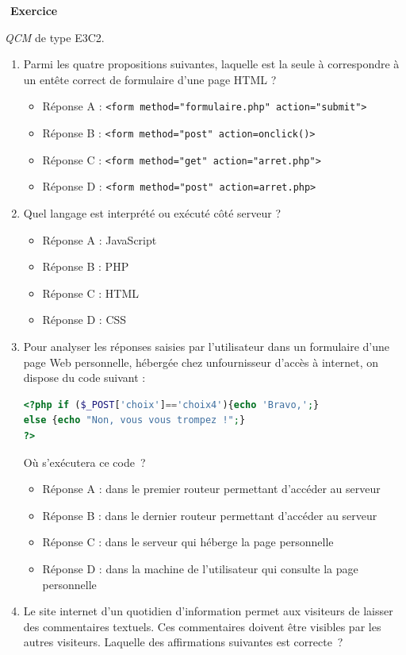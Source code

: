 \documentclass[
  11pt,
]{article}
\newcommand{\passthrough}[1]{#1}
\providecommand{\tightlist}{%
  \setlength{\itemsep}{0pt}\setlength{\parskip}{0pt}}
\newcounter{exo}
\newenvironment{exercice}[1]
{\par \medskip   \addtocounter{exo}{1} \noindent  
\begin{bclogo}[arrondi =0.1,   noborder = true, logo=\bccrayon, marge=4]{~\textbf{Exercice} \textbf{\theexo} {\itshape #1} }  \par}
{
\end{bclogo}
 \par \bigskip }
\newcounter{prop}
\newcounter{def}
\begin{document}
\begin{exercice}{}

\emph{QCM} de type E3C2.

\begin{enumerate}
\def\labelenumi{\arabic{enumi}.}
\item
  Parmi les quatre propositions suivantes, laquelle est la seule à
  correspondre à un entête correct de formulaire d'une page HTML ?

  \begin{itemize}
  \tightlist
  \item
    Réponse A :
    \passthrough{\lstinline!<form method="formulaire.php" action="submit">!}
  \item
    Réponse B :
    \passthrough{\lstinline!<form method="post" action=onclick()>!}
  \item
    Réponse C :
    \passthrough{\lstinline!<form method="get" action="arret.php">!}
  \item
    Réponse D :
    \passthrough{\lstinline!<form method="post" action=arret.php>!}
  \end{itemize}
\item
  Quel langage est interprété ou exécuté côté serveur ?

  \begin{itemize}
  \tightlist
  \item
    Réponse A : JavaScript
  \item
    Réponse B : PHP
  \item
    Réponse C : HTML
  \item
    Réponse D : CSS
  \end{itemize}
\item
  Pour analyser les réponses saisies par l'utilisateur dans un
  formulaire d'une page Web personnelle, hébergée chez unfournisseur
  d'accès à internet, on dispose du code suivant :

\begin{lstlisting}[language=PHP]
<?php if ($_POST['choix']=='choix4'){echo 'Bravo,';}
else {echo "Non, vous vous trompez !";}
?>
\end{lstlisting}

  Où s'exécutera ce code~?

  \begin{itemize}
  \tightlist
  \item
    Réponse A : dans le premier routeur permettant d'accéder au serveur
  \item
    Réponse B : dans le dernier routeur permettant d'accéder au serveur
  \item
    Réponse C : dans le serveur qui héberge la page personnelle
  \item
    Réponse D : dans la machine de l'utilisateur qui consulte la page
    personnelle
  \end{itemize}
\item
  Le site internet d'un quotidien d'information permet aux visiteurs de
  laisser des commentaires textuels. Ces commentaires doivent être
  visibles par les autres visiteurs. Laquelle des affirmations suivantes
  est correcte~?


\end{enumerate}
\end{exercice}
\end{document}
